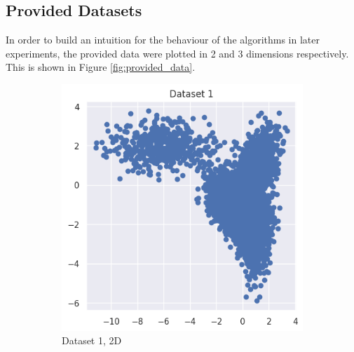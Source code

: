 \documentclass[12pt]{article}
\begin{document}
\subsection{Provided Datasets}

In order to build an intuition for the behaviour of the algorithms in later
experiments, the provided data were plotted in 2 and 3 dimensions respectively.
This is shown in Figure \ref{fig:provided_data}.

\begin{figure}[h]
    \centering
    \begin{subfigure}{0.3\textwidth}
      \centering
      \includegraphics[width=\linewidth]{0.png}
      \caption{Dataset 1, 2D}
      \label{fig:provided_data_1}
    \end{subfigure}%
    \hfill
    \begin{subfigure}{0.3\textwidth}
      \centering

\end{subfigure}
\end{figure}
\end{document}
